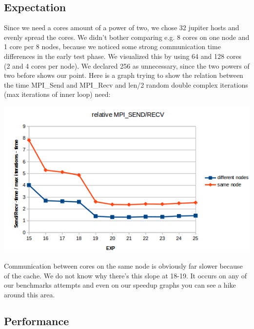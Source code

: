 \subsection{Expectation}
Since we need a cores amount of a power of two, we chose 32 jupiter hosts and evenly spread the cores. We didn't bother comparing e.g. 8 cores on one node and 1 core per 8 nodes, because we noticed some strong communication time differences in the early test phase. We visualized this by using 64 and 128 cores (2 and 4 cores per node). We declared 256 as unnecessary, since the two powers of two before shows our point.\newline
Here is a graph trying to show the relation between the time MPI\_Send and MPI\_Recv and len/2 random double complex iterations (max iterations of inner loop) need:
\begin{center}
\includegraphics[width=\textwidth]{MPI_sr}
\end{center}
Communication between cores on the same node is obviously far slower because of the cache. We do not know why there's this slope at 18-19. It occurs on any of our benchmarks attempts and even on our speedup graphs you can see a hike around this area. 

\subsection{Performance}

